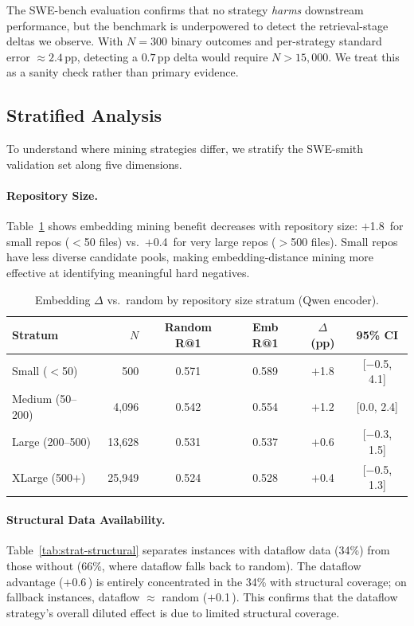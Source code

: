 \documentclass[11pt]{article}
\newcommand{\pp}{\,\text{pp}}
\begin{document}
The SWE-bench evaluation confirms that no strategy \emph{harms} downstream performance, but the benchmark is underpowered to detect the retrieval-stage deltas we observe.
With $N=300$ binary outcomes and per-strategy standard error $\approx 2.4\pp{}$, detecting a $0.7\pp{}$ delta would require $N > 15{,}000$.
We treat this as a sanity check rather than primary evidence.

\subsection{Stratified Analysis}
\label{sec:stratified}

To understand where mining strategies differ, we stratify the SWE-smith validation set along five dimensions.

\paragraph{Repository Size.}
Table~\ref{tab:strat-repo} shows embedding mining benefit decreases with repository size: $+$1.8\pp{} for small repos ($<$50 files) vs.\ $+$0.4\pp{} for very large repos ($>$500 files).
Small repos have less diverse candidate pools, making embedding-distance mining more effective at identifying meaningful hard negatives.

\begin{table}[t]
\centering
\caption{Embedding $\Delta$ vs.\ random by repository size stratum (Qwen encoder).}
\label{tab:strat-repo}
\begin{tabular}{lrcccc}
\toprule
Stratum & $N$ & Random R@1 & Emb R@1 & $\Delta$ (pp) & 95\% CI \\
\midrule
Small ($<$50)      &   500 & 0.571 & 0.589 & $+$1.8 & [$-$0.5, 4.1] \\
Medium (50--200)   & 4{,}096 & 0.542 & 0.554 & $+$1.2 & [0.0, 2.4] \\
Large (200--500)   & 13{,}628 & 0.531 & 0.537 & $+$0.6 & [$-$0.3, 1.5] \\
XLarge (500$+$)    & 25{,}949 & 0.524 & 0.528 & $+$0.4 & [$-$0.5, 1.3] \\
\bottomrule
\end{tabular}
\end{table}

\paragraph{Structural Data Availability.}
Table~\ref{tab:strat-structural} separates instances with dataflow data (34\%) from those without (66\%, where dataflow falls back to random).
The dataflow advantage ($+$0.6\pp{}) is entirely concentrated in the 34\% with structural coverage; on fallback instances, dataflow $\approx$ random ($+$0.1\pp{}).
This confirms that the dataflow strategy's overall diluted effect is due to limited structural coverage.
\end{document}
